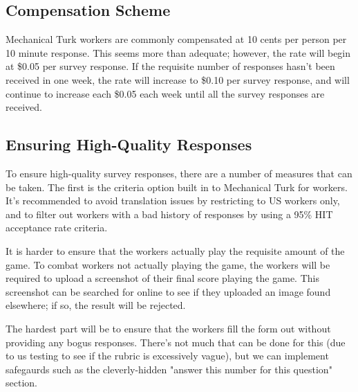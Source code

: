 	\subsection{Compensation Scheme}
		Mechanical Turk workers are commonly compensated at 10 cents per person per 10 minute response. This seems more than adequate; however, the rate will begin at \$0.05 per survey response. If the requisite number of responses hasn't been received in one week, the rate will increase to \$0.10 per survey response, and will continue to increase each \$0.05 each week until all the survey responses are received.
	\subsection{Ensuring High-Quality Responses}
		To ensure high-quality survey responses, there are a number of measures that can be taken. The first is the criteria option built in to Mechanical Turk for workers. It's recommended to avoid translation issues by restricting to US workers only, and to filter out workers with a bad history of responses by using a 95\% HIT acceptance rate criteria.

		It is harder to ensure that the workers actually play the requisite amount of the game. To combat workers not actually playing the game, the workers will be required to upload a screenshot of their final score playing the game. This screenshot can be searched for online to see if they uploaded an image found elsewhere; if so, the result will be rejected.

		The hardest part will be to ensure that the workers fill the form out without providing any bogus responses. There's not much that can be done for this (due to us testing to see if the rubric is excessively vague), but we can implement safegaurds such as the cleverly-hidden "answer this number for this question" section.